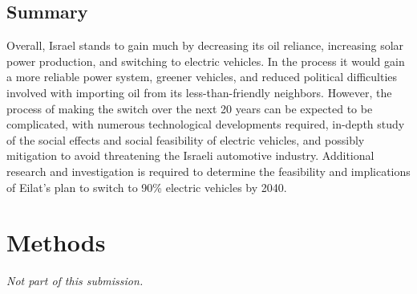 \documentclass{report}                         %
\begin{document}
\section{Summary}

Overall, Israel stands to gain much by decreasing its oil reliance, increasing solar power production, and switching to electric vehicles. In the process it would gain a more reliable power system, greener vehicles, and reduced political difficulties involved with importing oil from its less-than-friendly neighbors. However, the process of making the switch over the next 20 years can be expected to be complicated, with numerous technological developments required, in-depth study of the social effects and social feasibility of electric vehicles, and possibly mitigation to avoid threatening the Israeli automotive industry. Additional research and investigation is required to determine the feasibility and implications of Eilat's plan to switch to 90\% electric vehicles by 2040.\

\newpage
\chapter{Methods}
\textit{Not part of this submission.}

\newpage
\bigskip


\end{document}
